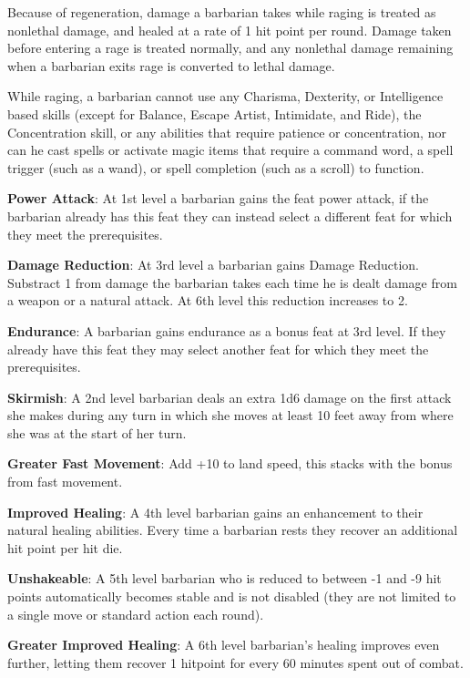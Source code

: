 Because of regeneration, damage a barbarian takes while raging is treated as nonlethal damage, and healed at a rate of 1 hit point per round. Damage taken before entering a rage is treated normally, and any nonlethal damage remaining when a barbarian exits rage is converted to lethal damage.

While raging, a barbarian cannot use any Charisma, Dexterity, or Intelligence based skills (except for Balance, Escape Artist, Intimidate, and Ride), the Concentration skill, or any abilities that require patience or concentration, nor can he cast spells or activate magic items that require a command word, a spell trigger (such as a wand), or spell completion (such as a scroll) to function.

\textbf{Power Attack}: At 1st level a barbarian gains the feat power attack, if the barbarian already has this feat they can instead select a different feat for which they meet the prerequisites.

\textbf{Damage Reduction}: At 3rd level a barbarian gains Damage Reduction. Substract 1 from damage the barbarian takes each time he is dealt damage from a weapon or a natural attack. At 6th level this reduction increases to 2.

\textbf{Endurance}: A barbarian gains endurance as a bonus feat at 3rd level. If they already have this feat they may select another feat for which they meet the prerequisites. 

\textbf{Skirmish}: A 2nd level barbarian deals an extra 1d6 damage on the first attack she makes during any turn in which she moves at least 10 feet away from where she was at the start of her turn. 

\textbf{Greater Fast Movement}: Add +10 to land speed, this stacks with the bonus from fast movement.

\textbf{Improved Healing}: A 4th level barbarian gains an enhancement to their natural healing abilities. Every time a barbarian rests they recover an additional hit point per hit die. 

\textbf{Unshakeable}: A 5th level barbarian who is reduced to between -1 and -9 hit points automatically becomes stable and is not disabled (they are not limited to a single move or standard action each round). 

\textbf{Greater Improved Healing}: A 6th level barbarian's healing improves even further, letting them recover 1 hitpoint for every 60 minutes spent out of combat. 